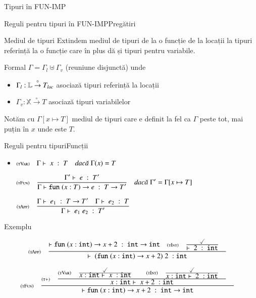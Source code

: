 \documentclass[xcolor=pdftex,romanian,colorlinks]{beamer}
\begin{document}
\begin{section}{Tipuri în FUN-IMP}
\begin{frame}{Reguli pentru tipuri în FUN-IMP}{Pregătiri}
\begin{block}{Mediul de tipuri}
Extindem mediul de tipuri de la o funcție de la locații la tipuri referință
la o funcție care în plus dă și tipuri pentru variabile.


Formal $\Gamma = \Gamma_l \uplus \Gamma_v$ (reuniune disjunctă) unde
\begin{itemize}
\item    $\Gamma_l : \mathbb{L} \stackrel\circ\rightarrow T_{\it loc}$ asociază tipuri referință la locații
\item    $\Gamma_v : \mathbb{X} \stackrel\circ\rightarrow T$ asociază tipuri variabilelor
\end{itemize}

Notăm cu $\Gamma[x\mapsto T]$ mediul de tipuri care e definit la fel ca $\Gamma$ peste tot, mai puțin în $x$ unde este $T$.
\end{block}
\end{frame}

\begin{frame}{Reguli pentru tipuri}{Funcții}
\begin{itemize}
\item[] $\reg[tVar]{\tjud{x}{T}}{}{\Gamma(x) = T}$

\vitem[] 
$\displaystyle\reg[tFun]{\tjud{\Sfun (x : T) \rightarrow e}{T \rightarrow T'}}{\tjud[\Gamma']{e}{T'}}{\Gamma' = \Gamma[x\mapsto T]}$

\vitem[]
$\displaystyle\reg[tApp]{\tjud{e_1\; e_2}{T'}}{\tjud{e_1}{T \rightarrow T'} \si \tjud{e_2}{T}}{}$
\end{itemize}
\end{frame}

\begin{frame}{Exemplu}{}


\[\displaystyle\reg[tApp]{
  \tjud[]{{(\Sfun (x:{\Sint}) \rightarrow x + 2)\; 2}}{\Sint}
}{
  \tjud[]{\Sfun (x:{\Sint}) \rightarrow x + 2}{{\Sint} \rightarrow {\Sint}}
    \si 
    \reg[tInt]{
      \tjud[]{2}{{\Sint}}
    }{
      \done
    }{}
}{}\]

\[
  \reg[tFun]{
    \tjud[]{\Sfun (x:{\Sint}) \rightarrow x + 2}{{\Sint} \rightarrow {\Sint}}
  }{
    \reg[t+]{
      \tjud[x:{\Sint}]{x+2}{\Sint}
  }{
      \reg[tVar]{
        \tjud[x:{\Sint}]{x}{\Sint}
      }{
        \done
      }{} 
      \si 
      \reg[tInt]{
        \tjud[x:{\Sint}]{2}{\Sint}
      }{
        \done
      }{}
  }{} 
  }{}
\]


\end{frame}
\end{section}
\end{document}
